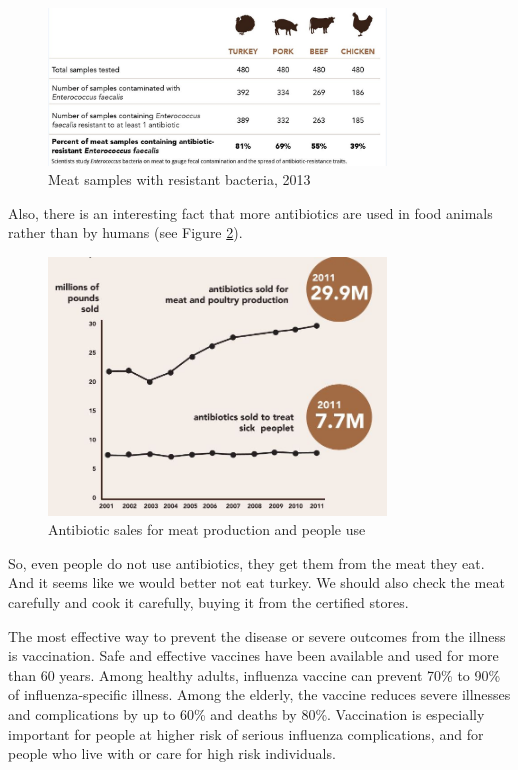 \begin{figure}[H]
  \centering
  \includegraphics[width=0.8\textwidth]{img/Fig11}
  \caption{Meat samples with resistant bacteria, 2013}
  \label{fig11}
\end{figure}

Also, there is an interesting fact that more antibiotics are used in food animals rather than by humans (see Figure \ref{fig12}).

\begin{figure}[H]
  \centering
  \includegraphics[width=0.8\textwidth]{img/Fig12}
  \caption{Antibiotic sales for meat production and people use}
  \label{fig12}
\end{figure}

So, even people do not use antibiotics, they get them from the meat they eat. And it seems like we would better not eat turkey. We should also check the meat carefully and cook it carefully, buying it from the certified stores.

The most effective way to prevent the disease or severe outcomes from the illness is vaccination. Safe and effective vaccines have been available and used for more than 60 years. Among healthy adults, influenza vaccine can prevent 70\% to 90\% of influenza-specific illness. Among the elderly, the vaccine reduces severe illnesses and complications by up to 60\% and deaths by 80\%. Vaccination is especially important for people at higher risk of serious influenza complications, and for people who live with or care for high risk individuals.

